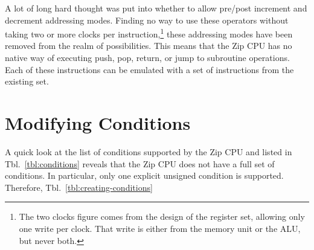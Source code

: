 \documentclass{gqtekspec}
\begin{document}
A lot of long hard thought was put into whether to allow pre/post increment
and decrement addressing modes.  Finding no way to use these operators without
taking two or more clocks per instruction,\footnote{The two clocks figure
comes from the design of the register set, allowing only one write per clock.
That write is either from the memory unit or the ALU, but never both.} these
addressing modes have been
removed from the realm of possibilities.  This means that the Zip CPU has no
native way of executing push, pop, return, or jump to subroutine operations.
Each of these instructions can be emulated with a set of instructions from the
existing set.

\section{Modifying Conditions}
A quick look at the list of conditions supported by the Zip CPU and listed
in Tbl.~\ref{tbl:conditions} reveals that the Zip CPU does not have a full set
of conditions.  In particular, only one explicit unsigned condition is
supported.  Therefore, Tbl.~\ref{tbl:creating-conditions}
\end{document}
